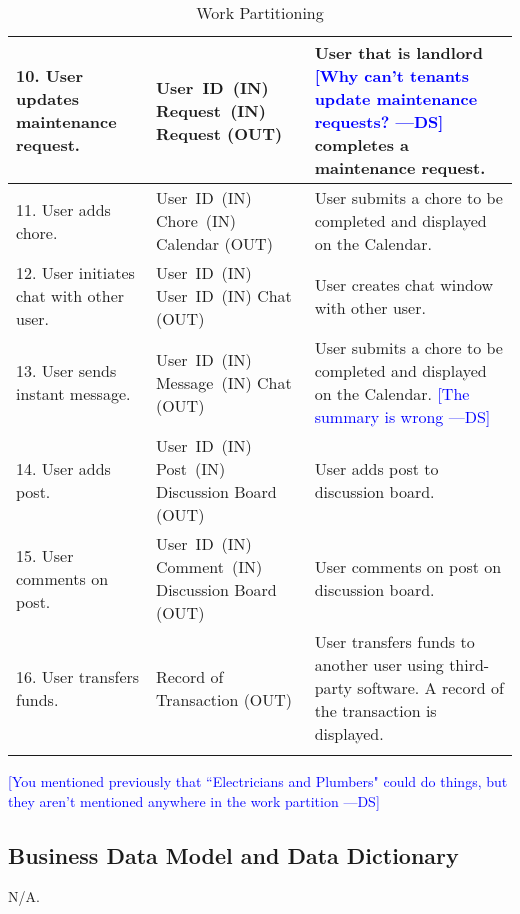 \documentclass[12pt, titlepage]{article}
\newcommand{\authornote}[3]{\textcolor{#1}{[#3 ---#2]}}
\newcommand{\authornote}[3]{}
\newcommand{\ds}[1]{\authornote{blue}{DS}{#1}}
\begin{document}
\begin{longtable}{|p{5cm}|p{5cm}|p{5cm}|}
\hline
10. User updates maintenance request. & \mbox{User ID (IN)} \linebreak 
\mbox{Request (IN)} \linebreak Request (OUT) & User that is landlord 
\ds{Why can't tenants update maintenance requests?}
completes a 
maintenance request. \\
\hline
11. User adds chore. & \mbox{User ID (IN)} \linebreak \mbox{Chore (IN)} 
\linebreak Calendar (OUT) & User submits a chore to be completed and displayed 
on the Calendar. \\
\hline
12. User initiates chat with other user. & \mbox{User ID (IN)} \linebreak 
\mbox{User ID (IN)} \linebreak Chat (OUT) & User creates chat window with other 
user. \\
\hline
13. User sends instant message. & \mbox{User ID (IN)} \linebreak \mbox{Message 
(IN)} \linebreak Chat (OUT) & User submits a chore to be completed and displayed 
on the Calendar. 
\ds {The summary is wrong}\\
\hline
14. User adds post. & \mbox{User ID (IN)} \linebreak \mbox{Post (IN)} \linebreak 
Discussion Board (OUT) & User adds post to discussion board. \\
\hline
15. User comments on post. & \mbox{User ID (IN)} \linebreak \mbox{Comment (IN)} 
\linebreak Discussion Board (OUT) & User comments on post on discussion board. 
\\
\hline
16. User transfers funds. & Record of Transaction (OUT) & User transfers funds 
to another user using third-party software. A record of the transaction is 
displayed. \\
\hline
\caption{Work Partitioning}
\end{longtable}

\ds{You mentioned previously that ``Electricians and Plumbers" could do things,
	but they aren't mentioned anywhere in the work partition}
	
\subsection{Business Data Model and Data Dictionary}
N/A.
\end{document}
